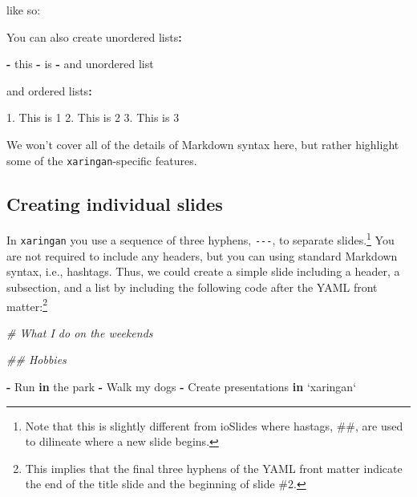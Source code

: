 \documentclass[
]{book}
\newenvironment{Shaded}{\begin{snugshade}}{\end{snugshade}}
\newcommand{\CommentTok}[1]{\textcolor[rgb]{0.37,0.37,0.37}{\textit{#1}}}
\newcommand{\ControlFlowTok}[1]{\textcolor[rgb]{0.27,0.27,0.27}{\textbf{#1}}}
\newcommand{\DataTypeTok}[1]{\textcolor[rgb]{0.27,0.27,0.27}{#1}}
\newcommand{\DecValTok}[1]{\textcolor[rgb]{0.06,0.06,0.06}{#1}}
\newcommand{\FloatTok}[1]{\textcolor[rgb]{0.06,0.06,0.06}{#1}}
\newcommand{\NormalTok}[1]{#1}
\newcommand{\OperatorTok}[1]{\textcolor[rgb]{0.43,0.43,0.43}{\textbf{#1}}}
\newcommand{\StringTok}[1]{\textcolor[rgb]{0.5,0.5,0.5}{#1}}
\begin{document}
like so:

\begin{Shaded}
\begin{Highlighting}[]
\NormalTok{You can also create unordered lists}\OperatorTok{:}\StringTok{ }

\OperatorTok{-}\StringTok{ }\NormalTok{this }
\OperatorTok{-}\StringTok{ }\NormalTok{is }
\OperatorTok{-}\StringTok{ }\NormalTok{and unordered list}

\NormalTok{and ordered lists}\OperatorTok{:}\StringTok{ }

\FloatTok{1.}\NormalTok{ This is }\DecValTok{1}
\FloatTok{2.}\NormalTok{ This is }\DecValTok{2}
\FloatTok{3.}\NormalTok{ This is }\DecValTok{3}
\end{Highlighting}
\end{Shaded}

We won't cover all of the details of Markdown syntax here, but rather highlight some of the \texttt{xaringan}-specific features.

\hypertarget{creating-individual-slides}{%
\subsection{Creating individual slides}\label{creating-individual-slides}}

In \texttt{xaringan} you use a sequence of three hyphens, \texttt{-\/-\/-}, to separate slides.\footnote{Note that this is slightly different from ioSlides where hastags, \#\#, are used to dilineate where a new slide begins.} You are not required to include any headers, but you can using standard Markdown syntax, i.e., hashtags. Thus, we could create a simple slide including a header, a subsection, and a list by including the following code after the YAML front matter:\footnote{This implies that the final three hyphens of the YAML front matter indicate the end of the title slide and the beginning of slide \#2.}

\begin{Shaded}
\begin{Highlighting}[]
\CommentTok{# What I do on the weekends}

\CommentTok{## Hobbies}

\OperatorTok{-}\StringTok{ }\NormalTok{Run }\ControlFlowTok{in}\NormalTok{ the park}
\OperatorTok{-}\StringTok{ }\NormalTok{Walk my dogs}
\OperatorTok{-}\StringTok{ }\NormalTok{Create presentations }\ControlFlowTok{in} \StringTok{`}\DataTypeTok{xaringan}\StringTok{`}
\end{Highlighting}
\end{Shaded}
\end{document}
